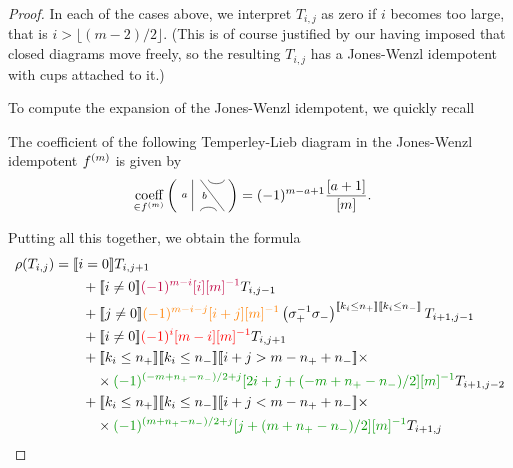 \documentclass[12pt]{article}
\begin{document}
\begin{proof}
In each of the cases above, we interpret $T_{i,j}$ as zero if $i$ becomes too large, that is $i > \lfloor (m-2)/2 \rfloor$. (This is of course justified by our having imposed that closed diagrams move freely, so the resulting $T_{i,j}$ has a Jones-Wenzl idempotent with cups attached to it.)

To compute the expansion of the Jones-Wenzl idempotent, we quickly recall
\begin{lem}
The coefficient of the following Temperley-Lieb diagram in the Jones-Wenzl idempotent $f^{(m)}$ is given by
\begin{align*}
\underset{\in \jw{m}}{\textrm{coeff}}
\left(
\begin{tikzpicture}[baseline = -.1cm, yscale=-.5]
	\draw (-.5,-.8)--(-.5,.8);
	\draw (-.3,.8) arc (-180:0:.2cm);
	\draw (-.3,-.8)--(.3,.8);
	\draw (-.1,-.8) arc (180:0:.2cm);
	\node at (-.7,0) {{\scriptsize{$a$}}};
	\node at (-.2,0) {{\scriptsize{$b$}}};
    \node at (.2,0) {$\phantom{c}$};
\end{tikzpicture}
\right)
& =
(-1)^{m-a+1}\frac{[a+1]}{[m]}.
\end{align*}
\end{lem}

  
Putting all this together, we obtain the formula
\begin{align*}
\rho(T_{i,j}) & =
\truth{i = 0} T_{i, j + 1} \\
& \qquad +
\truth{i \neq 0} \textcolor{purple}{(-1)^{m-i} [i][m]^{-1}} T_{i,j-1} \\
& \qquad +
\truth{j \neq 0}\textcolor{orange}{(-1)^{m-i-j} [i+j][m]^{-1}} \left(\sigma_+^{-1} \sigma_-\right)^{\truth{k_i \leq n_+} \truth{k_i \leq n_-}} T_{i+1, j-1} \\
& \qquad +
\truth{i \neq 0}\textcolor{red}{(-1)^{i}  [m-i][m]^{-1}} T_{i, j + 1} \\
& \qquad +
\truth{k_i \leq n_+} \truth{k_i \leq n_-}
\truth{i+j > m - n_+ + n_-} \times \\
& \qquad \quad \times \textcolor{DarkGreen}{(-1)^{(-m + n_+ - n_-)/2 + j} [2i + j + (-m + n_+ - n_-)/2][m]^{-1}} T_{i+1,j-2} \\
& \qquad +
\truth{k_i \leq n_+} \truth{k_i \leq n_-}
\truth{i+j < m - n_+ + n_-} \times \\
& \qquad \quad \times \textcolor{DarkGreen}{(-1)^{(m + n_+ - n_-)/2 + j} [j+ (m + n_+ - n_-)/2 ][m]^{-1}} T_{i+1,j}
\end{align*}


\end{proof}
\end{document}
